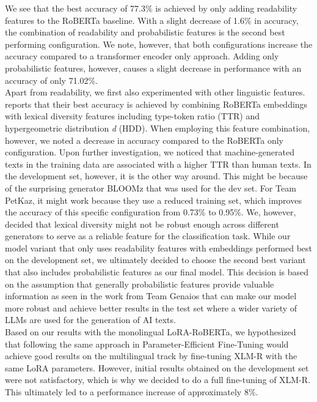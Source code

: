 \documentclass[11pt]{article}
\begin{document}
We see that the best accuracy of 77.3\% is achieved by only adding readability features to the RoBERTa baseline. With a slight 
decrease of 1.6\% in accuracy, the combination of readability and probabilistic features is the second best performing configuration. We note, however, that both configurations 
increase the accuracy compared to a transformer encoder only approach. Adding only probabilistic features, however, causes a slight decrease in performance with an 
accuracy of only 71.02\%.\\
Apart from readability, we first also experimented with other linguistic features. \cite{petukhova2024petkaz} reports that their best accuracy is achieved by combining 
RoBERTa embeddings with lexical diversity features including type-token ratio (TTR) and hypergeometric distribution \emph{d} (HDD). When employing this feature
combination, however, we noted a decrease in accuracy compared to the RoBERTa only configuration. Upon further investigation, we noticed that machine-generated texts 
in the training data are associated with a higher TTR than human texts. In the development set, however, it is the other way around. This might be because 
of the surprising generator BLOOMz that was used for the dev set. For Team PetKaz, it might work because they use a reduced training 
set, which improves the accuracy of this specific configuration from 0.73\% to 0.95\%. We, however, decided that lexical diversity might not 
be robust enough across different generators to serve as a reliable feature for the classification task.
While our model variant that only uses readability features with embeddings performed best on the development set, we ultimately decided to choose the second best variant 
that also includes probabilistic features as our final model. This decision is based on the assumption that generally probabilistic features provide valuable information as 
seen in the work from Team Genaios that can make our model more robust and achieve better results in the test set where a wider variety of LLMs are used for the generation of
AI texts.\\

Based on our results with the monolingual LoRA-RoBERTa, we hypothesized that following the same approach in Parameter-Efficient Fine-Tuning would achieve good results on the multilingual
track by fine-tuning XLM-R with the same LoRA parameters. However, initial results obtained on the development set were not satisfactory, which is why we decided to do a full fine-tuning of XLM-R. 
This ultimately led to a performance increase of approximately 8\%. 
\end{document}
